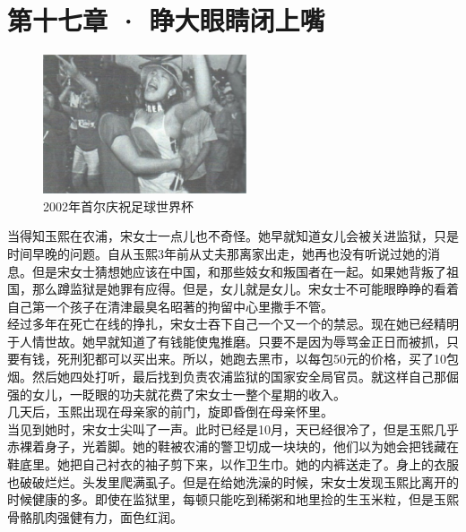 \fancyhead[RO]{\thepage}
\fancyhead[LE]{\thepage}
\fancyfoot[LE,RO]{}
\fancyfoot[LO,CE]{}
\fancyfoot[CO,RE]{}
\chapter*{第十七章 · 睁大眼睛闭上嘴}
\begin{figure}[!htbp]
\centering
\includegraphics[width=6cm]{./Chapters/Images/17.jpg}
\caption*{2002年首尔庆祝足球世界杯}
\end{figure}


当得知玉熙在农浦，宋女士一点儿也不奇怪。她早就知道女儿会被关进监狱，只是时间早晚的问题。自从玉熙3年前从丈夫那离家出走，她再也没有听说过她的消息。但是宋女士猜想她应该在中国，和那些妓女和叛国者在一起。如果她背叛了祖国，那么蹲监狱是她罪有应得。但是，女儿就是女儿。宋女士不可能眼睁睁的看着自己第一个孩子在清津最臭名昭著的拘留中心里撒手不管。\\

经过多年在死亡在线的挣扎，宋女士吞下自己一个又一个的禁忌。现在她已经精明于人情世故。她早就知道了有钱能使鬼推磨。只要不是因为辱骂金正日而被抓，只要有钱，死刑犯都可以买出来。所以，她跑去黑市，以每包50元的价格，买了10包烟。然后她四处打听，最后找到负责农浦监狱的国家安全局官员。就这样自己那倔强的女儿，一眨眼的功夫就花费了宋女士一整个星期的收入。\\

几天后，玉熙出现在母亲家的前门，旋即昏倒在母亲怀里。\\

当见到她时，宋女士尖叫了一声。此时已经是10月，天已经很冷了，但是玉熙几乎赤裸着身子，光着脚。她的鞋被农浦的警卫切成一块块的，他们以为她会把钱藏在鞋底里。她把自己衬衣的袖子剪下来，以作卫生巾。她的内裤送走了。身上的衣服也破破烂烂。头发里爬满虱子。但是在给她洗澡的时候，宋女士发现玉熙比离开的时候健康的多。即使在监狱里，每顿只能吃到稀粥和地里捡的生玉米粒，但是玉熙骨骼肌肉强健有力，面色红润。\\


